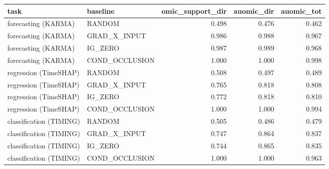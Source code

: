 \begin{tabular}{llrrr}
\toprule
task & baseline & omic_support_dir & auomic_dir & auomic_tot \\
\midrule
forecasting (KARMA) & RANDOM & 0.498 & 0.476 & 0.462 \\
forecasting (KARMA) & GRAD_X_INPUT & 0.986 & 0.988 & 0.967 \\
forecasting (KARMA) & IG_ZERO & 0.987 & 0.989 & 0.968 \\
forecasting (KARMA) & COND_OCCLUSION & 1.000 & 1.000 & 0.998 \\
regression (TimeSHAP) & RANDOM & 0.508 & 0.497 & 0.489 \\
regression (TimeSHAP) & GRAD_X_INPUT & 0.765 & 0.818 & 0.808 \\
regression (TimeSHAP) & IG_ZERO & 0.772 & 0.818 & 0.810 \\
regression (TimeSHAP) & COND_OCCLUSION & 1.000 & 1.000 & 0.994 \\
classification (TIMING) & RANDOM & 0.505 & 0.486 & 0.479 \\
classification (TIMING) & GRAD_X_INPUT & 0.747 & 0.864 & 0.837 \\
classification (TIMING) & IG_ZERO & 0.744 & 0.865 & 0.835 \\
classification (TIMING) & COND_OCCLUSION & 1.000 & 1.000 & 0.963 \\
\bottomrule
\end{tabular}
